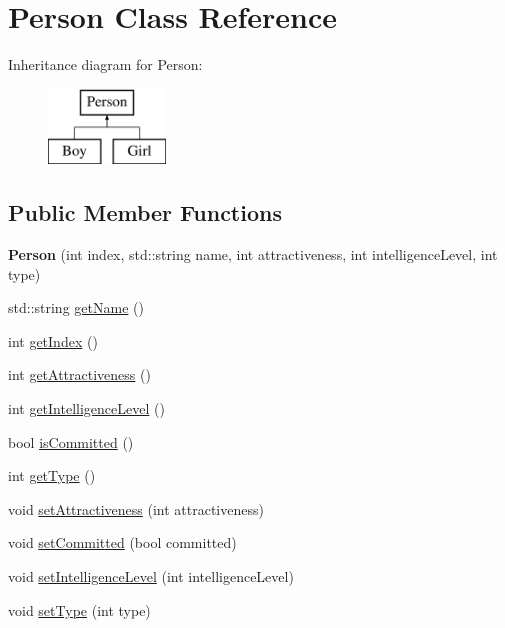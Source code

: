 \hypertarget{class_person}{}\section{Person Class Reference}
\label{class_person}
Inheritance diagram for Person\+:\begin{figure}[H]
\begin{center}
\leavevmode
\includegraphics[height=2.000000cm]{class_person}
\end{center}
\end{figure}
\subsection*{Public Member Functions}
\begin{DoxyCompactItemize}
\item 
\mbox{\label{class_person_adb2544355d4e11633c99388d1b7bfd12}} 
{\bfseries Person} (int index, std\+::string name, int attractiveness, int intelligence\+Level, int type)
\item 
std\+::string \hyperlink{class_person_ae1a03b01b79596d533e63c0a866e2525}{get\+Name} ()
\item 
int \hyperlink{class_person_ac75bad62721ee53f0e765353984e1290}{get\+Index} ()
\item 
int \hyperlink{class_person_a5d9004521f0591b18c07e69423274714}{get\+Attractiveness} ()
\item 
int \hyperlink{class_person_ac3fcb86ca37de466997783e1f60080a3}{get\+Intelligence\+Level} ()
\item 
bool \hyperlink{class_person_a05b6e810e9bbf95d5346a18082e9d799}{is\+Committed} ()
\item 
int \hyperlink{class_person_a5c653289ac6e18bb1b588c688f39430a}{get\+Type} ()
\item 
void \hyperlink{class_person_a26236ea8f9fbc4171df210edd6ccd2ea}{set\+Attractiveness} (int attractiveness)
\item 
void \hyperlink{class_person_a96d58d6da36c25c246ae0fc9370084d2}{set\+Committed} (bool committed)
\item 
void \hyperlink{class_person_ac8633ca29c81c39e8aed74992633c720}{set\+Intelligence\+Level} (int intelligence\+Level)
\item 
void \hyperlink{class_person_a02b0a78cc72c4808785c6e390bd06946}{set\+Type} (int type)
\end{DoxyCompactItemize}


